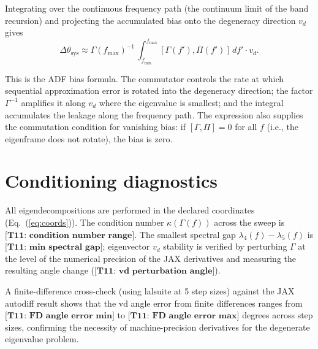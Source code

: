 \documentclass[twocolumn,prd,showpacs,superscriptaddress]{revtex4-2}
\newcommand{\vd}{v_{d}}          %
\newcommand{\eqnref}[1]{Eq.~(\ref{eq:#1})}
\newcommand{\manifest}[1]{\textbf{[#1]}}
\begin{document}
Integrating over the continuous frequency path (the continuum limit of
the band recursion) and projecting the accumulated bias onto the
degeneracy direction $\vd$ gives
\begin{equation}
\Delta\theta_{\text{sys}} \approx
\Gamma(f_{\text{max}})^{-1}\,
\int_{f_{\text{min}}}^{f_{\text{max}}}
[\Gamma(f'), \Pi(f')]\,df' \cdot \vd .
\label{eq:sys_offset}
\end{equation}

This is the ADF bias formula.  The commutator controls the rate at
which sequential approximation error is rotated into the degeneracy
direction; the factor $\Gamma^{-1}$ amplifies it along $\vd$ where
the eigenvalue is smallest; and the integral accumulates the leakage
along the frequency path.  The expression also supplies the
commutation condition for vanishing bias: if $[\Gamma, \Pi] = 0$ for
all $f$ (i.e., the eigenframe does not rotate), the bias is zero.

\section{Conditioning diagnostics}
\label{sec:appendix_conditioning}

All eigendecompositions are performed in the declared coordinates
(\eqnref{coords}).  The condition number $\kappa(\Gamma(f))$ across
the sweep is $\manifest{T11: condition number range}$.  The smallest
spectral gap $\lambda_4(f) - \lambda_5(f)$ is
$\manifest{T11: min spectral gap}$; eigenvector $\vd$ stability is
verified by perturbing $\Gamma$ at the level of the numerical
precision of the JAX derivatives and measuring the resulting angle
change ($\manifest{T11: vd perturbation angle}$).

A finite-difference cross-check (using lalsuite at 5 step sizes)
against the JAX autodiff result shows that the vd angle error from
finite differences ranges from $\manifest{T11: FD angle error min}$
to $\manifest{T11: FD angle error max}$ degrees across step sizes,
confirming the necessity of machine-precision derivatives for the
degenerate eigenvalue problem.
\end{document}
